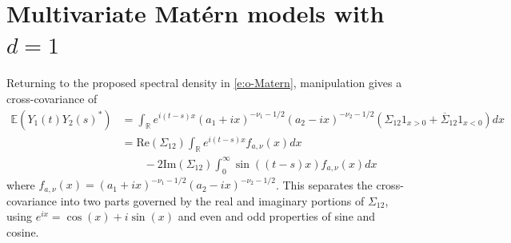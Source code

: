 \documentclass[11pt]{article}
\begin{document}
% 

% 

\section{Multivariate Mat\'ern models with $d=1$}\label{Introduce_model}

Returning to the proposed spectral density in \eqref{e:o-Matern}, manipulation gives a cross-covariance of \begin{align}
\mathbb{E}\left(Y_1(t) Y_2(s)^*\right)&=\int_\mathbb{R} e^{i(t-s)x}(a_1 + ix)^{-\nu_1 - 1/2}(a_2 - ix)^{-\nu_2 - 1/2}(\Sigma_{12}1_{x > 0} + \overline{\Sigma}_{12}1_{x < 0}) dx \\
&=\textrm{Re}(\Sigma_{12})\int_\mathbb{R}e^{i(t-s)x} f_{a,\nu}( x) dx \label{repart}\\
& \ \ \ \ \ \ \ \ \ -2\textrm{Im}(\Sigma_{12})\int_0^\infty \sin((t-s)x) f_{a,\nu}(x) dx
\label{impart2}
\end{align}where $f_{a,\nu}(x) =(a_1 + ix)^{-\nu_1 - 1/2}(a_2 - ix)^{-\nu_2 - 1/2}$.
This separates the cross-covariance into two parts governed by the real and imaginary portions of $\Sigma_{12}$, using $e^{ix} = \cos(x) + i\sin(x)$ and even and odd properties of sine and cosine.
\end{document}
